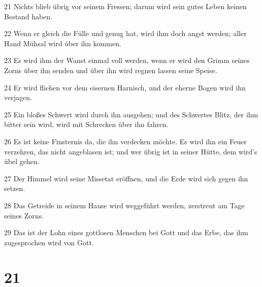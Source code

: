 \par 21 Nichts blieb übrig vor seinem Fressen; darum wird sein gutes Leben keinen Bestand haben.
\par 22 Wenn er gleich die Fülle und genug hat, wird ihm doch angst werden; aller Hand Mühsal wird über ihn kommen.
\par 23 Es wird ihm der Wanst einmal voll werden, wenn er wird den Grimm seines Zorns über ihn senden und über ihn wird regnen lassen seine Speise.
\par 24 Er wird fliehen vor dem eisernen Harnisch, und der eherne Bogen wird ihn verjagen.
\par 25 Ein bloßes Schwert wird durch ihn ausgehen; und des Schwertes Blitz, der ihm bitter sein wird, wird mit Schrecken über ihn fahren.
\par 26 Es ist keine Finsternis da, die ihn verdecken möchte. Es wird ihn ein Feuer verzehren, das nicht angeblasen ist; und wer übrig ist in seiner Hütte, dem wird's übel gehen.
\par 27 Der Himmel wird seine Missetat eröffnen, und die Erde wird sich gegen ihn setzen.
\par 28 Das Getreide in seinem Hause wird weggeführt werden, zerstreut am Tage seines Zorns.
\par 29 Das ist der Lohn eines gottlosen Menschen bei Gott und das Erbe, das ihm zugesprochen wird von Gott.

\chapter{21}

